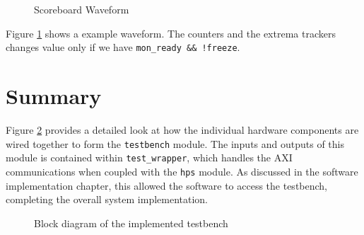 \begin{figure}[H]
  \centering
  
  \caption{Scoreboard Waveform}
  \label{ScoreboardWave}
\end{figure}

Figure \ref{ScoreboardWave} shows a example waveform.
The counters and the extrema trackers changes value only if we have \texttt{mon\_ready \&\& !freeze}.


\section{Summary}

Figure \ref{DBlock} provides a detailed look at how the individual hardware components are wired together to form the \texttt{testbench} module.
The inputs and outputs of this module is contained within \texttt{test\_wrapper}, which handles the AXI communications when coupled with the \texttt{hps} module.
As discussed in the software implementation chapter, this allowed the software to access the testbench, completing the overall system implementation.

\begin{sidewaysfigure}
  \begin{figure}[H]
    \centering
    
    \caption{Block diagram of the implemented testbench}
    \label{DBlock}
  \end{figure}
\end{sidewaysfigure}

